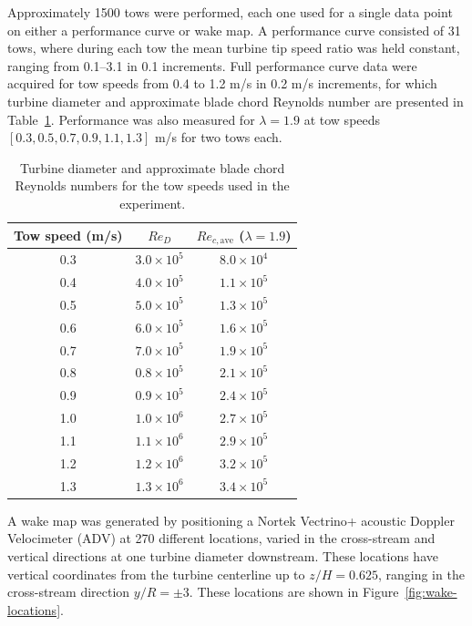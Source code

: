 \documentclass[energies,article,accept,moreauthors,pdftex,12pt,a4paper]{mdpi}
\begin{document}
Approximately 1500 tows were performed, each one used for a single data point on
either a performance curve or wake map. A performance curve consisted of 31
tows, where during each tow the mean turbine tip speed ratio was held constant,
ranging from 0.1--3.1 in 0.1 increments. Full performance curve data were
acquired for tow speeds from 0.4 to 1.2 m/s in 0.2 m/s increments, for which
turbine diameter and approximate blade chord Reynolds number are presented in
Table~\ref{tab:Re}. Performance was also measured for $\lambda=1.9$ at tow
speeds $[0.3, 0.5, 0.7, 0.9, 1.1, 1.3]$ m/s for two tows each.

\begin{table}
\centering
\begin{tabular}{ccc}
Tow speed (m/s) & $Re_D$ & $Re_{c,\mathrm{ave}}$ ($\lambda = 1.9$) \\ 
\hline
0.3 & $3.0 \times 10^5$ & $8.0 \times 10^4$ \\ 
0.4 & $4.0 \times 10^5$ & $1.1 \times 10^5$ \\ 
0.5 & $5.0 \times 10^5$ & $1.3 \times 10^5$ \\ 
0.6 & $6.0 \times 10^5$ & $1.6 \times 10^5$ \\ 
0.7 & $7.0 \times 10^5$ & $1.9 \times 10^5$ \\ 
0.8 & $0.8 \times 10^5$ & $2.1 \times 10^5$ \\ 
0.9 & $0.9 \times 10^5$ & $2.4 \times 10^5$ \\ 
1.0 & $1.0 \times 10^6$ & $2.7 \times 10^5$ \\ 
1.1 & $1.1 \times 10^6$ & $2.9 \times 10^5$ \\ 
1.2 & $1.2 \times 10^6$ & $3.2 \times 10^5$ \\ 
1.3 & $1.3 \times 10^6$ & $3.4 \times 10^5$ \\ 
\end{tabular} 
\caption{Turbine diameter and approximate blade chord Reynolds numbers for the
tow speeds used in the experiment.}
\label{tab:Re}
\end{table}

A wake map was generated by positioning a Nortek Vectrino+ acoustic Doppler
Velocimeter (ADV) at 270 different locations, varied in the cross-stream and
vertical directions at one turbine diameter downstream. These locations have
vertical coordinates from the turbine centerline up to $z/H=0.625$, ranging in
the cross-stream direction $y/R = \pm 3$. These locations are shown in
Figure~\ref{fig:wake-locations}.
\end{document}
